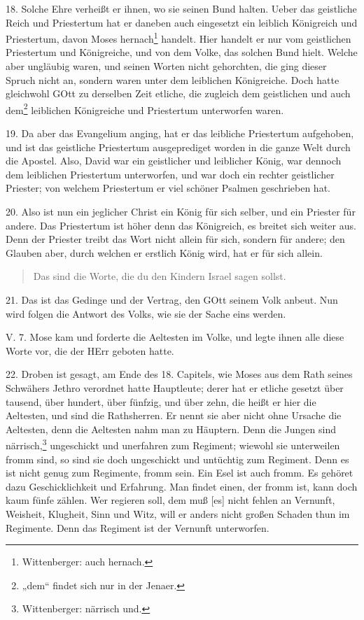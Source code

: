 18. Solche Ehre verheißt er ihnen, wo sie seinen Bund halten. Ueber das geistliche Reich und Priestertum hat er daneben auch eingesetzt ein leiblich Königreich und Priestertum, davon Moses hernach\footnote{Wittenberger: auch hernach.} handelt. Hier handelt er nur vom geistlichen Priestertum und Königreiche, und von dem Volke, das solchen Bund hielt. Welche aber ungläubig waren, und seinen Worten nicht gehorchten, die ging dieser Spruch nicht an, sondern waren unter dem leiblichen Königreiche. Doch hatte gleichwohl GOtt zu derselben Zeit etliche, die zugleich dem geistlichen und auch dem\footnote{„dem“ findet sich nur in der Jenaer.} leiblichen Königreiche und Priestertum unterworfen waren.

19. Da aber das Evangelium anging, hat er das leibliche Priestertum aufgehoben, und ist das geistliche Priestertum ausgeprediget worden in die ganze Welt durch die Apostel. Also, David war ein geistlicher und leiblicher König, war dennoch dem leiblichen Priestertum unterworfen, und war doch ein rechter geistlicher Priester; von welchem Priestertum er viel schöner Psalmen geschrieben hat.

20. Also ist nun ein jeglicher Christ ein König für sich selber, und ein Priester für andere. Das Priestertum ist höher denn das Königreich, es breitet sich weiter aus. Denn der Priester treibt das Wort nicht allein für sich, sondern für andere; den Glauben aber, durch welchen er erstlich König wird, hat er für sich allein.

\begin{quote}
Das sind die Worte, die du den Kindern Israel sagen sollst.
\end{quote}

21. Das ist das Gedinge und der Vertrag, den GOtt seinem Volk anbeut. Nun wird folgen die Antwort des Volks, wie sie der Sache eins werden.

\begin{schriftzitat}
V. 7. Mose kam und forderte die Aeltesten im Volke, und legte ihnen alle diese Worte vor, die der HErr geboten hatte.
\end{schriftzitat}

22. Droben ist gesagt, am Ende des 18. Capitels, wie Moses aus dem Rath seines Schwähers Jethro verordnet hatte Hauptleute; derer hat er etliche gesetzt über tausend, über hundert, über fünfzig, und über zehn, die heißt er hier die Aeltesten, und sind die Rathsherren. Er nennt sie aber nicht ohne Ursache die Aeltesten, denn die Aeltesten nahm man zu Häuptern. Denn die Jungen sind närrisch,\footnote{Wittenberger: närrisch und.} ungeschickt und unerfahren zum Regiment; wiewohl sie unterweilen fromm sind, so sind sie doch ungeschickt und untüchtig zum Regiment. Denn es ist nicht genug zum Regimente, fromm sein. Ein Esel ist auch fromm. Es gehöret dazu Geschicklichkeit und Erfahrung. Man findet einen, der fromm ist, kann doch kaum fünfe zählen. Wer regieren soll, dem muß [es] nicht fehlen an Vernunft, Weisheit, Klugheit, Sinn und Witz, will er anders nicht großen Schaden thun im Regimente. Denn das Regiment ist der Vernunft unterworfen.

